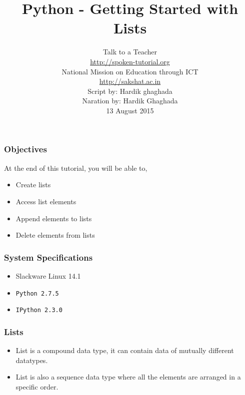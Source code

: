 \documentclass[17pt,compress]{beamer}
\author[FOSSEE]{}
\institute[IIT Bombay]{}
\date[]{}
\begin{document}
\sffamily \bfseries
\title
[Getting Started with Lists]
{Python - Getting Started with Lists}
\author
[FOSSEE, IIT - Bombay]
{\small Talk to a Teacher\\{\color{blue}\url{http://spoken-tutorial.org}}\\National Mission on Education
 through ICT\\{\color{blue}\url{http://sakshat.ac.in}} \\[0.5cm]{\tiny Script by: Hardik ghaghada \\ Naration by: Hardik Ghaghada \\ 13 August 2015}}

\begin{frame}
   \titlepage
\end{frame}
\begin{frame}
\frametitle{Objectives}
  At the end of this tutorial, you will be able to, \pause
\begin{itemize}
\item Create lists\pause
\item Access list elements\pause
\item Append elements to lists\pause
\item Delete elements from lists
\end{itemize}
\end{frame}
\begin{frame}
\frametitle{System Specifications}\pause
\begin{itemize}
\item Slackware Linux 14.1\pause
\item \texttt{Python 2.7.5} \pause
\item \texttt{IPython 2.3.0}
\end{itemize}
\end{frame}
\begin{frame}
\frametitle{Lists}
\begin{itemize}
\item List is a compound data type, it can contain data of mutually
different datatypes.\pause
\item List is also a sequence data type where all the
elements are arranged in a specific order.
\end{itemize}
\end{frame}
\end{document}
